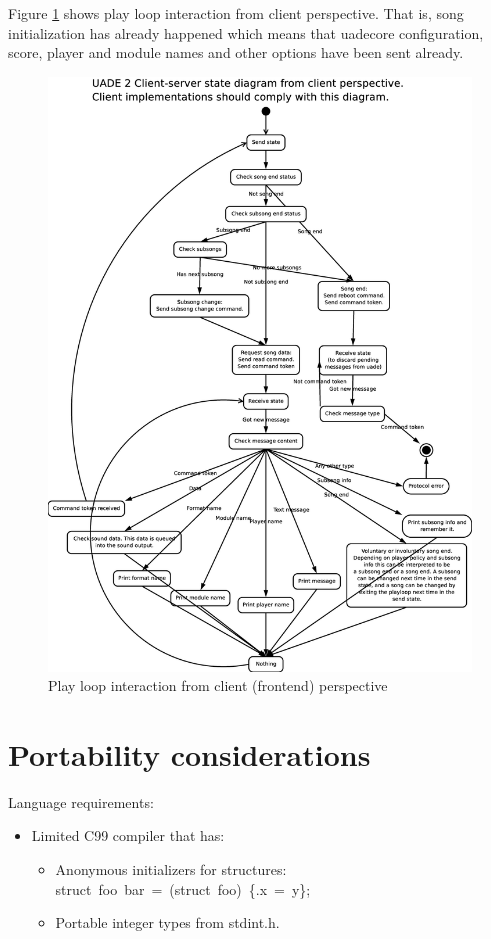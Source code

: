 \documentclass{article}
\begin{document}
Figure \ref{fig:playloop} shows play loop interaction from client
perspective. That is, song initialization has already happened which means
that uadecore configuration, score, player and module names and other
options have been sent already.

\begin{figure}
\centering
\includegraphics[scale=0.25]{play_loop_state_diagram.eps}
\caption{Play loop interaction from client (frontend) perspective}
\label{fig:playloop}
\end{figure}

\section{Portability considerations}

Language requirements:
\begin{itemize}
\item Limited C99 compiler that has:
  \begin{itemize}
  \item Anonymous initializers for structures: \mbox{struct foo bar = (struct foo) \{.x = y\};}
  \item Portable integer types from stdint.h.
  \end{itemize}
\end{itemize}
\end{document}

